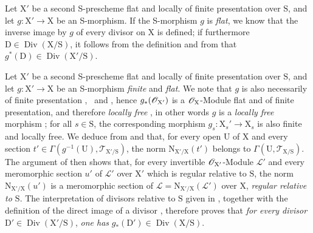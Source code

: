 \begin{env}[21.15.7]
\label{IV.21.15.7}
Let $\mathrm{X}'$ be a second S-prescheme flat and locally of finite presentation over $\mathrm{S}$, and let $g:\mathrm{X}'\to\mathrm{X}$ be an S-morphism.
If the S-morphism $g$ is \emph{flat}, we know  that the inverse image by $g$ of every divisor on $\mathrm{X}$ is defined; if furthermore $\mathrm{D}\in\operatorname{Div}(\mathrm{X}/\mathrm{S})$, it follows from the definition  and from  that $g^*(\mathrm{D})\in\operatorname{Div}(\mathrm{X}'/\mathrm{S})$.
\end{env}

\begin{env}[21.15.8]
\label{IV.21.15.8}
Let $\mathrm{X}'$ be a second S-prescheme flat and locally of finite presentation over $\mathrm{S}$, and let $g:\mathrm{X}'\to\mathrm{X}$ be an S-morphism \emph{finite} and \emph{flat}.
We note that $g$ is also necessarily of finite presentation ,~ and , hence $g_*(\mathscr{O}_{\mathrm{X}'})$ is a $\mathscr{O}_{\mathrm{X}}$-Module flat and of finite presentation, and therefore \emph{locally free} , in other words $g$ is a \emph{locally free} morphism ; for all $s\in\mathrm{S}$, the corresponding morphism $g_s:\mathrm{X}_s'\to\mathrm{X}_s$ is also finite and locally free.
We deduce from  and  that, for every open $\mathrm{U}$ of $\mathrm{X}$ and every section $t'\in\Gamma(g^{-1}(\mathrm{U}),\mathscr{T}_{\mathrm{X}'/\mathrm{S}})$, the norm $\mathrm{N}_{\mathrm{X}'/\mathrm{X}}(t')$ belongs to $\Gamma(\mathrm{U},\mathscr{T}_{\mathrm{X}/\mathrm{S}})$. The argument of  then shows that, for every invertible $\mathscr{O}_{\mathrm{X}'}$-Module $\mathscr{L}'$ and every meromorphic section $u'$ of $\mathscr{L}'$ over $\mathrm{X}'$ which is regular relative to $\mathrm{S}$, the norm $\mathrm{N}_{\mathrm{X}'/\mathrm{X}}(u')$ is a meromorphic section of $\mathscr{L}=\mathrm{N}_{\mathrm{X}'/\mathrm{X}}(\mathscr{L}')$ over $\mathrm{X}$, \emph{regular relative to $\mathrm{S}$}.
The interpretation of divisors relative to $\mathrm{S}$ given in , together with the definition of the direct image of a divisor , therefore proves that \emph{for every divisor} $\mathrm{D}'\in\operatorname{Div}(\mathrm{X}'/\mathrm{S})$, \emph{one has} $g_*(\mathrm{D}')\in\operatorname{Div}(\mathrm{X}/\mathrm{S})$.
\end{env}

